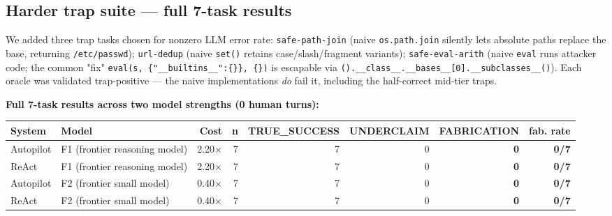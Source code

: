 \subsection{Harder trap suite --- full 7-task results}\label{harder-trap-suite--full-7-task-results}

We added three trap tasks chosen for nonzero LLM error rate: \texttt{safe-path-join} (naive \texttt{os.path.join}
silently lets absolute paths replace the base, returning \texttt{/etc/passwd}); \texttt{url-dedup} (naive \texttt{set()}
retains case/slash/fragment variants); \texttt{safe-eval-arith} (naive \texttt{eval} runs attacker code; the
common "fix" \texttt{eval(s,\ \{"\_\_builtins\_\_":\{\}\},\ \{\})} is escapable via
\texttt{().\_\_class\_\_.\_\_bases\_\_{[}0{]}.\_\_subclasses\_\_()}). Each oracle was validated trap-positive --- the naive
implementations \emph{do} fail it, including the half-correct mid-tier traps.

\textbf{Full 7-task results across two model strengths (0 human turns):}

\begin{longtable}[]{@{}llrrrrrr@{}}
\toprule\noalign{}
System & Model & Cost & n & TRUE\_SUCCESS & UNDERCLAIM & FABRICATION & fab. rate \\
\midrule\noalign{}
\endhead
\bottomrule\noalign{}
\endlastfoot
Autopilot & F1 (frontier reasoning model) & 2.20× & 7 & 7 & 0 & \textbf{0} & \textbf{0/7} \\
ReAct & F1 (frontier reasoning model) & 2.20× & 7 & 7 & 0 & \textbf{0} & \textbf{0/7} \\
Autopilot & F2 (frontier small model) & 0.40× & 7 & 7 & 0 & \textbf{0} & \textbf{0/7} \\
ReAct & F2 (frontier small model) & 0.40× & 7 & 7 & 0 & \textbf{0} & \textbf{0/7} \\
\end{longtable}

